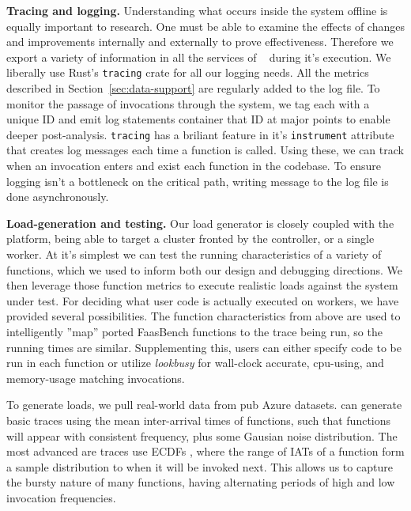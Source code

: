 \textbf{Tracing and logging.}
Understanding what occurs inside the system offline is equally important to research.
One must be able to examine the effects of changes and improvements internally and externally to prove effectiveness.
Therefore we export a variety of information in all the services of \sysname~ during it's execution.
We liberally use Rust's \texttt{tracing} crate for all our logging needs.
All the metrics described in Section~\ref{sec:data-support} are regularly added to the log file.
To monitor the passage of invocations through the system, we tag each with a unique ID and emit log statements container that ID at major points to enable deeper post-analysis.
\texttt{tracing} has a briliant feature in it's \texttt{instrument} attribute that creates log messages each time a function is called.
Using these, we can track when an invocation enters and exist each function in the codebase.
To ensure logging isn't a bottleneck on the critical path, writing message to the log file is done asynchronously.


\textbf{Load-generation and testing.}
Our load generator is closely coupled with the platform, being able to target a cluster fronted by the controller, or a single worker.
At it's simplest we can test the running characteristics of a variety of functions, which we used to inform both our design and debugging directions.
We then leverage those function metrics to execute realistic loads against the system under test.
For deciding what user code is actually executed on workers, we have provided several possibilities.
The function characteristics from above are used to intelligently ''map'' ported FaasBench \cite{} functions to the trace being run, so the running times are similar.
Supplementing this, users can either specify code to be run in each function or utilize \emph{lookbusy} \cite{} for wall-clock accurate, cpu-using, and memory-usage matching invocations.


To generate loads, we pull real-world data from pub Azure \cite{} datasets.
\sysname{} can generate basic traces using the mean inter-arrival times of functions, such that functions will appear with consistent frequency, plus some Gausian noise distribution.
The most advanced are traces use ECDFs \cite{}, where the range of IATs of a function form a sample distribution to when it will be invoked next.
This allows us to capture the bursty nature of many functions, having alternating periods of high and low invocation frequencies.




